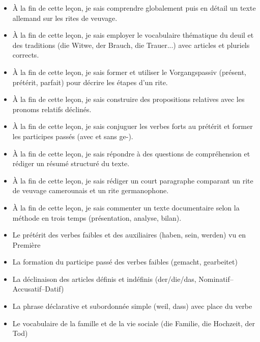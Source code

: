 \documentclass[11pt]{article}
\begin{document}
\begin{objectifs}
\begin{itemize}
\item À la fin de cette leçon, je sais comprendre globalement puis en détail un texte allemand sur les rites de veuvage.
\item À la fin de cette leçon, je sais employer le vocabulaire thématique du deuil et des traditions (die Witwe, der Brauch, die Trauer...) avec articles et pluriels corrects.
\item À la fin de cette leçon, je sais former et utiliser le Vorgangspassiv (présent, prétérit, parfait) pour décrire les étapes d'un rite.
\item À la fin de cette leçon, je sais construire des propositions relatives avec les pronoms relatifs déclinés.
\item À la fin de cette leçon, je sais conjuguer les verbes forts au prétérit et former les participes passés (avec et sans ge-).
\item À la fin de cette leçon, je sais répondre à des questions de compréhension et rédiger un résumé structuré du texte.
\item À la fin de cette leçon, je sais rédiger un court paragraphe comparant un rite de veuvage camerounais et un rite germanophone.
\item À la fin de cette leçon, je sais commenter un texte documentaire selon la méthode en trois temps (présentation, analyse, bilan).
\end{itemize}
\end{objectifs}

\begin{prerequis}
\begin{itemize}
\item Le prétérit des verbes faibles et des auxiliaires (haben, sein, werden) vu en Première
\item La formation du participe passé des verbes faibles (gemacht, gearbeitet)
\item La déclinaison des articles définis et indéfinis (der/die/das, Nominatif–Accusatif–Datif)
\item La phrase déclarative et subordonnée simple (weil, dass) avec place du verbe
\item Le vocabulaire de la famille et de la vie sociale (die Familie, die Hochzeit, der Tod)
\end{itemize}
\end{prerequis}

\newpage
\end{document}
